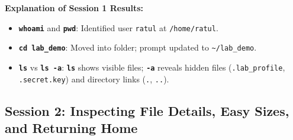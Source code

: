 \documentclass[10pt,a4paper,portrait]{article}
\newcommand{\cmd}[1]{\texttt{\textbf{#1}}}
\begin{document}
\vspace{2pt}\noindent\textbf{Explanation of Session 1 Results:}\par\vspace{1pt}
\begin{itemize}[noitemsep,topsep=1pt,leftmargin=1.2em]
  \item \cmd{whoami} and \cmd{pwd}: Identified user \texttt{ratul} at \texttt{/home/ratul}.
  \item \cmd{cd lab\_demo}: Moved into folder; prompt updated to \texttt{\textasciitilde/lab\_demo}.
  \item \cmd{ls} vs \cmd{ls -a}: \cmd{ls} shows visible files; \cmd{-a} reveals hidden files (\texttt{.lab\_profile}, \texttt{.secret.key}) and directory links (\texttt{.}, \texttt{..}).
\end{itemize}

\subsection{Session 2: Inspecting File Details, Easy Sizes, and Returning Home}
\end{document}
